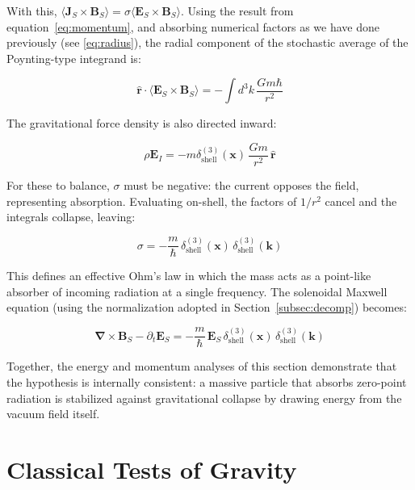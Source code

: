 \documentclass {article}
\renewcommand\vec{\mathbf}
\let\OldS\nabla
\renewcommand{\nabla}{\boldsymbol{\OldS}}
\let\OldHat\hat
\renewcommand{\hat}[1]{\OldHat{\mathbf{#1}}}
\begin{document}
\noindent With this, $\langle \vec{J}_S \times \vec{B}_S \rangle = \sigma \langle \vec{E}_S \times \vec{B}_S \rangle$. Using the result from equation~\eqref{eq:momentum}, and absorbing numerical factors as we have done previously (see \eqref{eq:radius}), the radial component of the stochastic average of the Poynting-type integrand is:

\begin{equation}
\hat{r} \cdot \langle \vec{E}_S \times \vec{B}_S \rangle = - \int d^3k\, \frac{Gm\hbar}{r^2}
\end{equation}

\noindent The gravitational force density is also directed inward:

\begin{equation}
\rho \vec{E}_I = -m\delta^{(3)}_{\text{shell}}(\vec{x})\, \frac{Gm}{r^2}\, \hat{r}
\end{equation}

\noindent For these to balance, $\sigma$ must be negative: the current opposes the field, representing absorption. Evaluating on-shell, the factors of $1/r^2$ cancel and the integrals collapse, leaving:

\begin{equation}
\sigma = -\frac{m}{\hbar}\, \delta^{(3)}_{\text{shell}}(\vec{x})\, \delta^{(3)}_{\text{shell}}(\vec{k})
\end{equation}

\noindent This defines an effective Ohm's law in which the mass acts as a point-like absorber of incoming radiation at a single frequency. The solenoidal Maxwell equation (using the normalization adopted in Section~\ref{subsec:decomp}) becomes:

\begin{equation}
\nabla \times \vec{B}_S - \partial_t \vec{E}_S = -\frac{m}{\hbar}\, \vec{E}_S\, \delta^{(3)}_{\text{shell}}(\vec{x})\, \delta^{(3)}_{\text{shell}}(\vec{k})
\label{eq:ohm}
\end{equation}

\noindent Together, the energy and momentum analyses of this section demonstrate that the hypothesis is internally consistent: a massive particle that absorbs zero-point radiation is stabilized against gravitational collapse by drawing energy from the vacuum field itself.





\section{Classical Tests of Gravity}
\end{document}
